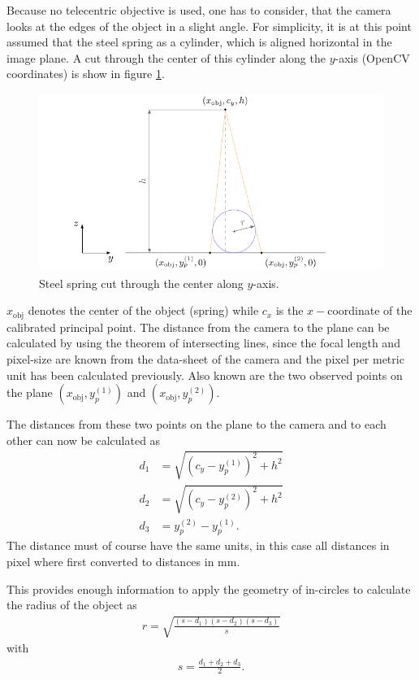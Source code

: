 Because no telecentric objective is used, one has to consider, that the camera looks at the edges of the object in a slight angle.
For simplicity, it is at this point assumed that the steel spring as a cylinder, which is aligned horizontal in the image plane.
A cut through the center of this cylinder along the $y$-axis (OpenCV coordinates) is show in figure \ref{development:diameter}.
\begin{figure}[ht]
	\centering
	\includegraphics[width=0.9\linewidth]{3-development/software/images/diameter_estimation.pdf}
	\caption{Steel spring cut through the center along $y$-axis.\label{development:diameter}}
\end{figure}
$x_{\text{obj}}$ denotes the center of the object (spring) while $c_x$ is the $x-$coordinate of the calibrated principal point.
The distance from the camera to the plane can be calculated by using the theorem of intersecting lines, since the focal length and pixel-size are known from the data-sheet of the camera and the pixel per metric unit has been calculated previously.
Also known are the two observed points on the plane $(x_{\text{obj}}, y_p^{(1)})$ and $(x_{\text{obj}}, y_p^{(2)})$.

The distances from these two points on the plane to the camera and to each other can now be calculated as
\begin{align*}
	d_{1}&=\sqrt{(c_y-y_p^{(1)})^2+h^2}\\
	d_{2}&=\sqrt{(c_y-y_p^{(2)})^2+h^2}\\
	d_{3}&=y_p^{(2)}-y_p^{(1)}.
\end{align*}
The distance must of course have the same units, in this case all distances in pixel where first converted to distances in mm.

This provides enough information to apply the geometry of in-circles \cite{incircles} to calculate the radius of the object as
\begin{align*}
	r=\sqrt{\frac{(s-d_1)(s-d_2)(s-d_3)}{s}}
\end{align*}
with
\begin{align*}
	s=\frac{d_1+d_2+d_3}{2}.
\end{align*}

